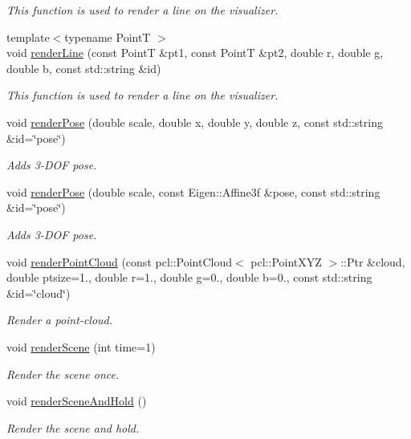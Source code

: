 \begin{DoxyCompactItemize}
\begin{DoxyCompactList}\small\item\em This function is used to render a line on the visualizer. \end{DoxyCompactList}\item 
{\footnotesize template$<$typename PointT $>$ }\\void \hyperlink{classtapl_1_1viz_1_1Visualizer_ae1c206c5746ed6b8f2df8054bbf24dc8}{render\+Line} (const PointT \&pt1, const PointT \&pt2, double r, double g, double b, const std\+::string \&id)
\begin{DoxyCompactList}\small\item\em This function is used to render a line on the visualizer. \end{DoxyCompactList}\item 
void \hyperlink{classtapl_1_1viz_1_1Visualizer_a53f92012bddc459991d93fa1886541b2}{render\+Pose} (double scale, double x, double y, double z, const std\+::string \&id=\char`\"{}pose\char`\"{})
\begin{DoxyCompactList}\small\item\em Adds 3-\/\+D\+OF pose. \end{DoxyCompactList}\item 
void \hyperlink{classtapl_1_1viz_1_1Visualizer_aaf2f80b7569aabec720105ecc9a95996}{render\+Pose} (double scale, const Eigen\+::\+Affine3f \&pose, const std\+::string \&id=\char`\"{}pose\char`\"{})
\begin{DoxyCompactList}\small\item\em Adds 3-\/\+D\+OF pose. \end{DoxyCompactList}\item 
void \hyperlink{classtapl_1_1viz_1_1Visualizer_adfbebe61032e265beba4b2276e1c7858}{render\+Point\+Cloud} (const pcl\+::\+Point\+Cloud$<$ pcl\+::\+Point\+X\+YZ $>$\+::Ptr \&cloud, double ptsize=1., double r=1., double g=0., double b=0., const std\+::string \&id=\char`\"{}cloud\char`\"{})
\begin{DoxyCompactList}\small\item\em Render a point-\/cloud. \end{DoxyCompactList}\item 
void \hyperlink{classtapl_1_1viz_1_1Visualizer_a8ec08b4e37523fb75731b58748224035}{render\+Scene} (int time=1)
\begin{DoxyCompactList}\small\item\em Render the scene once. \end{DoxyCompactList}\item 
void \hyperlink{classtapl_1_1viz_1_1Visualizer_aed14efd9e578a4b6013b9745e07acea1}{render\+Scene\+And\+Hold} ()
\begin{DoxyCompactList}\small\item\em Render the scene and hold. \end{DoxyCompactList}\end{DoxyCompactItemize}


